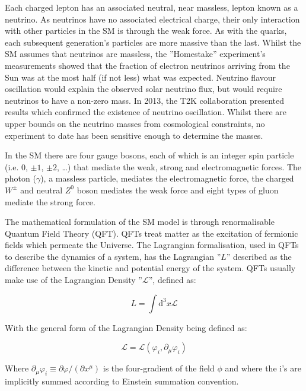 Each charged lepton has an associated neutral, near massless, lepton known as a neutrino. 
As neutrinos have no associated electrical charge, their only interaction with other particles in the SM is through the weak force. 
As with the quarks, each subsequent generation’s particles are more massive than the last. 
Whilst the SM assumes that neutrinos are massless, the ''Homestake'' experiment’s measurements showed that the fraction of electron neutrinos arriving from the Sun was at the most half (if not less) what was expected\cite{PhysRevLett.20.1205}. 
Neutrino flavour oscillation would explain the observed solar neutrino flux, but would require neutrinos to have a non-zero mass. 
In 2013, the T2K collaboration presented results which confirmed the existence of neutrino oscillation\cite{PhysRevD.88.032002}. 
Whilst there are upper bounds on the neutrino masses from cosmological constraints, no experiment to date has been sensitive enough to determine the masses\cite{1475-7516-2006-06-019}. 

In the SM there are four gauge bosons, each of which is an integer spin particle (i.e. 0, $\pm 1$, $\pm 2$, …) that mediate the weak, strong and electromagnetic forces. 
The photon ($\gamma$), a massless particle, mediates the electromagnetic force, the charged $W^\pm$ and neutral $Z^0$ boson mediates the weak force and eight types of gluon mediate the strong force\cite{LagrangiansSM}. 

The mathematical formulation of the SM model is through renormalisable Quantum Field Theory (QFT). 
QFTs treat matter as the excitation of fermionic fields which permeate the Universe. 
The Lagrangian formalisation, used in QFTs to describe the dynamics of a system, has the Lagrangian ''$L$'' described as the difference between the kinetic and potential energy of the system. 
QFTs usually make use of the Lagrangian Density ''$\mathcal{L}$'', defined as:

\begin{equation}
L = \int \mathrm{d^{3}}x \mathcal{L}
\end{equation}

With the general form of the Lagrangian Density being defined as:

\begin{equation}
\mathcal{L} = \mathcal{L} ( \varphi_{i}, \partial _{\mu} \varphi_{i} )
\end{equation}

Where $\partial _{\mu}\varphi_{i} \equiv \partial \varphi / (\partial x^{\mu} )$ is the four-gradient of the field $\phi$ and where the i’s are implicitly summed according to Einstein summation convention.

